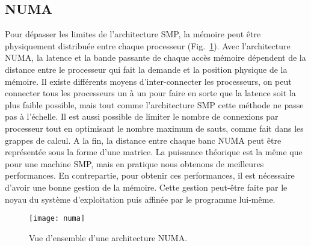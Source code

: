 \subsection{NUMA}
Pour dépasser les limites de l'architecture SMP, la mémoire peut être physiquement distribuée entre chaque processeur (Fig.~\ref{fig:numa}).
%
Avec l'architecture NUMA, la latence et la bande passante de chaque accès mémoire dépendent de la distance entre le processeur qui fait la demande et la position physique de la mémoire.
%
Il existe différents moyens d'inter-connecter les processeurs, on peut connecter tous les processeurs un à un pour faire en sorte que la latence soit la plus faible possible, mais tout comme l'architecture SMP cette méthode ne passe pas à l'échelle.
%
Il est aussi possible de limiter le nombre de connexions par processeur tout en optimisant le nombre maximum de sauts, comme fait dans les grappes de calcul.
%
A la fin, la distance entre chaque banc NUMA peut être représentée sous la forme d'une matrice.
%
La puissance théorique est la même que pour une machine SMP, mais en pratique nous obtenons de meilleures performances.
%
En contrepartie, pour obtenir ces performances, il est nécessaire d'avoir une bonne gestion de la mémoire.
%
Cette gestion peut-être faite par le noyau du système d'exploitation puis affinée par le programme lui-même.

\begin{figure}[!ht]
  \centering
  \texttt{[image: numa]}
  \caption{Vue d'ensemble d'une architecture NUMA.}
  \label{fig:numa}
\end{figure}

